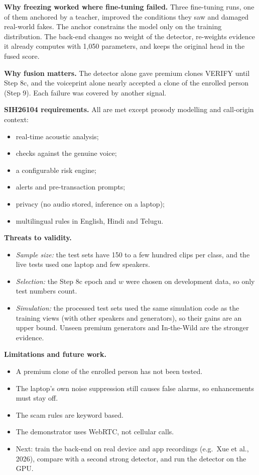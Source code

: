 \documentclass[10pt,a4paper,twocolumn]{article}
\begin{document}
\textbf{Why freezing worked where fine-tuning failed.} Three fine-tuning runs, one of them anchored by a teacher, improved the conditions they saw and damaged real-world fakes. The anchor constrains the model only on the training distribution. The back-end changes no weight of the detector, re-weights evidence it already computes with 1,050 parameters, and keeps the original head in the fused score.

\textbf{Why fusion matters.} The detector alone gave premium clones VERIFY until Step 8c, and the voiceprint alone nearly accepted a clone of the enrolled person (Step 9). Each failure was covered by another signal.

\textbf{SIH26104 requirements.} All are met except prosody modelling and call-origin context:
\begin{itemize}\setlength\itemsep{0pt}
\item real-time acoustic analysis;
\item checks against the genuine voice;
\item a configurable risk engine;
\item alerts and pre-transaction prompts;
\item privacy (no audio stored, inference on a laptop);
\item multilingual rules in English, Hindi and Telugu.
\end{itemize}

\textbf{Threats to validity.}
\begin{itemize}\setlength\itemsep{0pt}
\item \emph{Sample size:} the test sets have 150 to a few hundred clips per class, and the live tests used one laptop and few speakers.
\item \emph{Selection:} the Step 8c epoch and $w$ were chosen on development data, so only test numbers count.
\item \emph{Simulation:} the processed test sets used the same simulation code as the training views (with other speakers and generators), so their gains are an upper bound. Unseen premium generators and In-the-Wild are the stronger evidence.
\end{itemize}

\textbf{Limitations and future work.}
\begin{itemize}\setlength\itemsep{0pt}
\item A premium clone of the enrolled person has not been tested.
\item The laptop's own noise suppression still causes false alarms, so enhancements must stay off.
\item The scam rules are keyword based.
\item The demonstrator uses WebRTC, not cellular calls.
\item Next: train the back-end on real device and app recordings (e.g.\ Xue et al., 2026), compare with a second strong detector, and run the detector on the GPU.
\end{itemize}
\end{document}
